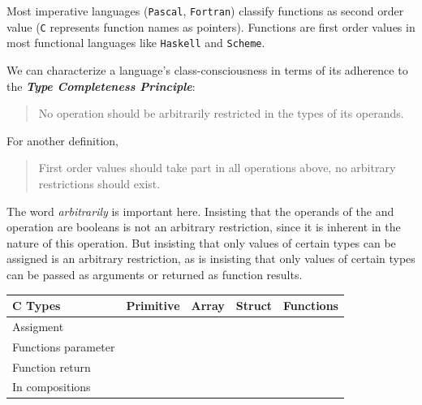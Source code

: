 \documentclass{article}
\newcommand{\cmark}{\ding{51}}
\newcommand{\xmark}{\ding{55}}
\begin{document}
Most imperative languages (\texttt{Pascal}, \texttt{Fortran}) classify functions as second order value (\texttt{C} represents function names as pointers). Functions are first order values in most functional languages like \texttt{Haskell} and \texttt{Scheme}.

We can characterize a language’s class-consciousness in terms of its adherence
to the \textbf{\textit{Type Completeness Principle}}:
\begin{quote}
    No operation should be arbitrarily restricted in the types of its operands.
\end{quote}
For another definition,
\begin{quote}
    First order values should take part in all operations above, no arbitrary restrictions should exist.
\end{quote}
The word \textit{arbitrarily} is important here. Insisting that the operands of the and operation are booleans is not an arbitrary restriction, since it is inherent in the nature of this operation. But insisting that only values of certain types can be assigned is an arbitrary restriction, as is insisting that only values of certain types can be passed as arguments or returned as function results.

\begin{table}[h!]
\centering
\begin{tabular}{|l|c c c c|}
\hline
\rowcolor[HTML]{96FFFB} 
{\color[HTML]{000000} \textbf{C Types}} & {\color[HTML]{000000} Primitive} & {\color[HTML]{000000} Array} & {\color[HTML]{000000} Struct} & {\color[HTML]{000000} Functions} \\ \hline
Assigment                               & \cmark            & \xmark        & \cmark         & \xmark            \\ \hline
Functions parameter                     & \cmark            & \xmark        & \cmark         & \xmark            \\ \hline
Function return                         & \cmark            & \xmark        & \cmark         & \xmark            \\ \hline
In compositions                         & \cmark            & \cmark        & \cmark         & \xmark            \\ \hline
\end{tabular}
\end{table}
\end{document}
